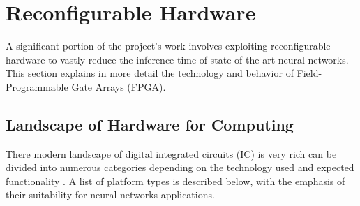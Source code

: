 \section{Reconfigurable Hardware}
A significant portion of the project's work involves exploiting reconfigurable hardware to vastly reduce the inference time of state-of-the-art neural networks. This section explains in more detail the technology and behavior of Field-Programmable Gate Arrays (FPGA).

\subsection{Landscape of Hardware for Computing}
There modern landscape of digital integrated circuits (IC) is very rich can be divided into numerous categories depending on the technology used and expected functionality \cite{14-najafi2017hardware}. A list of platform types is described below, with the emphasis of their suitability for neural networks applications.

